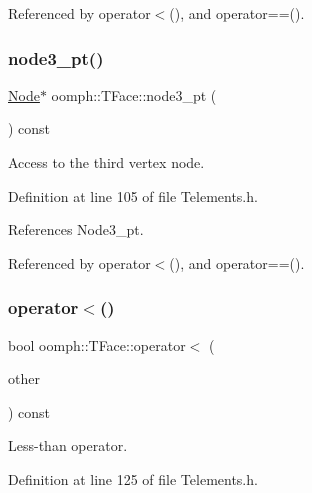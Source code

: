 Referenced by operator$<$(), and operator==().

\mbox{\label{classoomph_1_1TFace_ade89b1a048f53fc0919d0bc6c0d837b8}} 
\subsubsection{\texorpdfstring{node3\+\_\+pt()}{node3\_pt()}}
{\footnotesize\ttfamily \hyperlink{classoomph_1_1Node}{Node}$\ast$ oomph\+::\+T\+Face\+::node3\+\_\+pt (\begin{DoxyParamCaption}{ }\end{DoxyParamCaption}) const\hspace{0.3cm}{\ttfamily [inline]}}



Access to the third vertex node. 



Definition at line 105 of file Telements.\+h.



References Node3\+\_\+pt.



Referenced by operator$<$(), and operator==().

\mbox{\label{classoomph_1_1TFace_aa99c3dec902942a67fea64ae6abecbac}} 
\subsubsection{\texorpdfstring{operator$<$()}{operator<()}}
{\footnotesize\ttfamily bool oomph\+::\+T\+Face\+::operator$<$ (\begin{DoxyParamCaption}\item[{const \hyperlink{classoomph_1_1TFace}{T\+Face} \&}]{other }\end{DoxyParamCaption}) const\hspace{0.3cm}{\ttfamily [inline]}}



Less-\/than operator. 



Definition at line 125 of file Telements.\+h.



